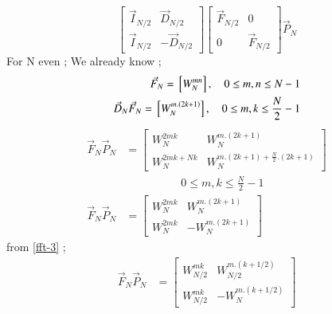 \documentclass[journal,12pt,twocolumn]{IEEEtran}
\renewcommand\thesection{\arabic{section}}
\begin{document}
\begin{enumerate}[label=\arabic*.,ref=\thesection.\theenumi]
\begin{equation}
\begin{bmatrix}
                     \vec{I}_{N/2} & \vec{D}_{N/2}  \\
                     \vec{I}_{N/2} & -\vec{D}_{N/2}
                \end{bmatrix}
                \begin{bmatrix}
                     \vec{F}_{N/2} & 0             \\
                     0             & \vec{F}_{N/2}
                \end{bmatrix}
                \vec{P}_{N}
           \end{equation}
           \solution
           For N even ;
           We already know ;
           \begin{align}
                \vec{F}_{N} = {}\left[W_{N}^{mn}\right], \quad 0 \le m,n \le N-1 \\
                \vec{D}_{N}\vec{F}_{N} = {}\left[W_{N}^{m.(2k+1)}\right], \quad 0 \le m,k \le \frac{N}{2}-1
           \end{align}
           \begin{align}
                \vec{F}_{N}\vec{P}_{N} & =\begin{bmatrix}
                                               {W_{N}^{2mk}} & {W_{N}^{m.(2k+1)}} \\ {W_{N}^{2mk+Nk}}&{W_{N}^{m.(2k+1)+\frac{N}{2}.(2k+1)}}
                                          \end{bmatrix}  \nonumber \\
                                       & \quad \quad \quad \quad \quad 0 \le m,k \le \frac{N}{2}-1  \nonumber                                                     \\
                \vec{F}_{N}\vec{P}_{N} & =\begin{bmatrix}
                                               {W_{N}^{2mk}} & {W_{N}^{m.(2k+1)}} \\ {W_{N}^{2mk}}&-{W_{N}^{m.(2k+1)}}
                                          \end{bmatrix}
           \end{align}
           from \eqref{fft-3} ;
           \begin{align}
                \vec{F}_{N}\vec{P}_{N} & =\begin{bmatrix}
                                               {W_{N/2}^{mk}} & {W_{N/2}^{m.(k+1/2)}} \\ {W_{N/2}^{mk}}&-{W_{N}^{m.(k+1/2)}}
                                          \end{bmatrix} \\

\end{align}
\end{enumerate}
\end{document}
